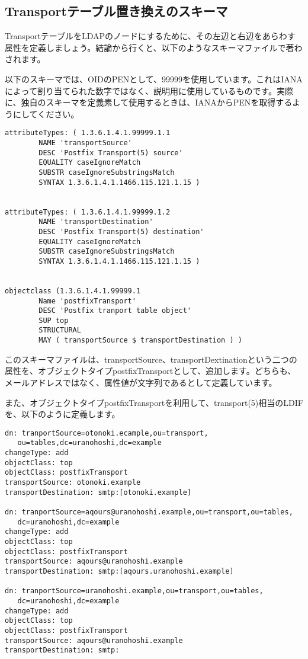 \subsection{Transportテーブル置き換えのスキーマ}
TransportテーブルをLDAPのノードにするために、その左辺と右辺をあらわす属性を定義しましょう。結論から行くと、以下のようなスキーマファイルで著わされます。

以下のスキーマでは、OIDのPENとして、99999を使用しています。これはIANAによって割り当てられた数字ではなく、説明用に使用しているものです。実際に、独自のスキーマを定義素して使用するときは、IANAからPENを取得するようにしてください。

\begin{verbatim}
attributeTypes: ( 1.3.6.1.4.1.99999.1.1
        NAME 'transportSource'
        DESC 'Postfix Transport(5) source'
        EQUALITY caseIgnoreMatch
        SUBSTR caseIgnoreSubstringsMatch
        SYNTAX 1.3.6.1.4.1.1466.115.121.1.15 )


attributeTypes: ( 1.3.6.1.4.1.99999.1.2
        NAME 'transportDestination'
        DESC 'Postfix Transport(5) destination'
        EQUALITY caseIgnoreMatch
        SUBSTR caseIgnoreSubstringsMatch
        SYNTAX 1.3.6.1.4.1.1466.115.121.1.15 )


objectclass (1.3.6.1.4.1.99999.1
        Name 'postfixTransport'
        DESC 'Postfix tranport table object'
        SUP top
        STRUCTURAL
        MAY ( transportSource $ transportDestination ) )
\end{verbatim}

このスキーマファイルは、transportSource、transportDextinationという二つの属性を、オブジェクトタイプpostfixTransportとして、追加します。どちらも、メールアドレスではなく、属性値が文字列であるとして定義しています。

また、オブジェクトタイプpostfixTransportを利用して、transport(5)相当のLDIFを、以下のように定義します。

\begin{verbatim}
dn: tranportSource=otonoki.ecample,ou=transport,
   ou=tables,dc=uranohoshi,dc=example
changeType: add
objectClass: top
objectClass: postfixTransport
transportSource: otonoki.example
transportDestination: smtp:[otonoki.example]

dn: tranportSource=aqours@uranohoshi.example,ou=transport,ou=tables,
   dc=uranohoshi,dc=example
changeType: add
objectClass: top
objectClass: postfixTransport
transportSource: aqours@uranohoshi.example
transportDestination: smtp:[aqours.uranohoshi.example]

dn: tranportSource=uranohoshi.example,ou=transport,ou=tables,
   dc=uranohoshi,dc=example
changeType: add
objectClass: top
objectClass: postfixTransport
transportSource: aqours@uranohoshi.example
transportDestination: smtp:

\end{verbatim}

